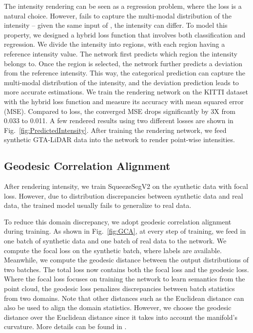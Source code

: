 \documentclass[letterpaper, 10 pt, conference]{ieeeconf}
\begin{document}
The intensity rendering can be seen as a regression problem, where the  loss is a natural choice. However,   fails to capture the multi-modal distribution of the intensity -- given the same input of , the intensity can differ. To model this property, we designed a hybrid loss function that involves both classification and regression. We divide the intensity into  regions, with each region having a reference intensity value. The network first predicts which region the intensity belongs to. Once the region is selected, the network further predicts a deviation from the reference intensity. This way, the categorical prediction can capture the multi-modal distribution of the intensity, and the deviation prediction leads to more accurate estimations. We train the rendering network on the KITTI \cite{geiger2012we} dataset with the hybrid loss function and measure its accuracy with mean squared error (MSE). Compared to  loss, the converged MSE drops significantly by 3X from 0.033 to 0.011. A few rendered results using two different losses are shown in Fig.~\ref{fig:PredictedIntensity}. After training the rendering network, we feed synthetic GTA-LiDAR data into the network to render point-wise intensities. 

\subsection{Geodesic Correlation Alignment}
\label{ssec:LE}
After rendering intensity, we train SqueezeSegV2 on the synthetic data with focal loss. However, due to distribution discrepancies between synthetic data and real data, the trained model usually fails to generalize to real data.

To reduce this domain discrepancy, we adopt geodesic correlation alignment during training. As shown in Fig.~\ref{fig:GCA}, at every step of training, we feed in one batch of synthetic data and one batch of real data to the network. We compute the focal loss on the synthetic batch, where labels are available. Meanwhile, we compute the geodesic distance \cite{morerio2018minimal} between the output distributions of two batches. The total loss now contains both the focal loss and the geodesic loss. Where the focal loss focuses on training the network to learn semantics from the point cloud, the geodesic loss penalizes discrepancies between batch statistics from two domains. Note that other distances such as the Euclidean distance can also be used to align the domain statistics. However, we choose the geodesic distance over the Euclidean distance since it takes into account the manifold’s curvature. More details can be found in \cite{morerio2018minimal}.
\end{document}
